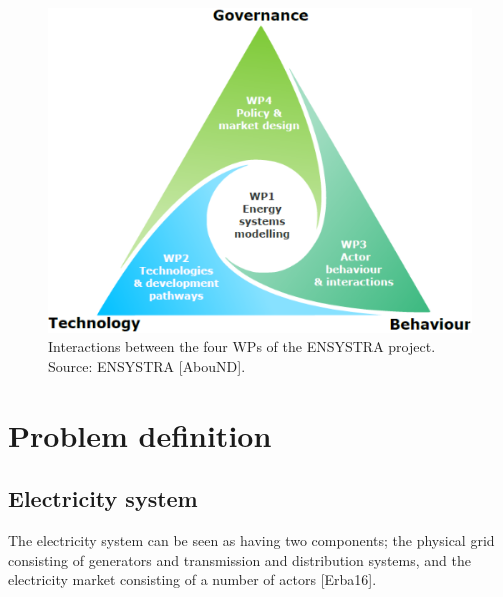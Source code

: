 \begin{figure}
\centering
\includegraphics{images/wp.png}
\caption{Interactions between the four WPs of the ENSYSTRA project.
Source: ENSYSTRA {[}AbouND{]}.}
\end{figure}

\hypertarget{problem-definition}{%
\section{Problem definition}\label{problem-definition}}

\hypertarget{electricity-system}{%
\subsection{Electricity system}\label{electricity-system}}

The electricity system can be seen as having two components; the
physical grid consisting of generators and transmission and distribution
systems, and the electricity market consisting of a number of actors
{[}Erba16{]}.

